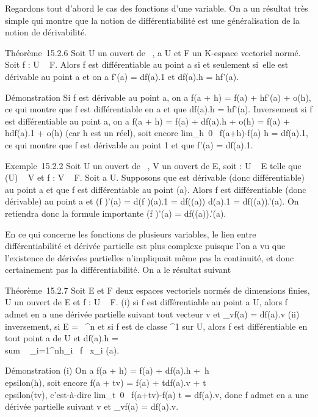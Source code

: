 Regardons tout d'abord le cas des fonctions d'une variable. On a un
résultat très simple qui montre que la notion de différentiabilité est
une généralisation de la notion de dérivabilité.

Théorème~15.2.6 Soit U un ouvert de ~, a \in U et F un K-espace vectoriel
normé. Soit f : U \rightarrow~ F. Alors f est différentiable au point a si et
seulement si~elle est dérivable au point a et on a f'(a) = df(a).1 et
df(a).h = hf'(a).

Démonstration Si f est dérivable au point a, on a f(a + h) = f(a) +
hf'(a) + o(h), ce qui montre que f est différentiable en a et que
df(a).h = hf'(a). Inversement si f est différentiable au point a, on a
f(a + h) = f(a) + df(a).h + o(h) = f(a) + hdf(a).1 + o(h) (car h est un
réel), soit encore lim_h\rightarrow~0~
f(a+h)-f(a) \over h = df(a).1, ce qui montre que f est
dérivable au point 1 et que f'(a) = df(a).1.

Exemple~15.2.2 Soit U un ouvert de ~, V un ouvert de E, soit \phi : U \rightarrow~ E
telle que \phi(U) \subset~ V et f : V \rightarrow~ F. Soit a \in U. Supposons que \phi est
dérivable (donc différentiable) au point a et que f est différentiable
au point \phi(a). Alors f \cdot \phi est différentiable (donc dérivable) au point
a et (f \cdot \phi)'(a) = d(f \cdot \phi)(a).1 = df(\phi(a)) \cdot d\phi(a).1 = df(\phi(a)).\phi'(a).
On retiendra donc la formule importante (f \cdot \phi)'(a) = df(\phi(a)).\phi'(a).

En ce qui concerne les fonctions de plusieurs variables, le lien entre
différentiabilité et dérivée partielle est plus complexe puisque l'on a
vu que l'existence de dérivées partielles n'impliquait même pas la
continuité, et donc certainement pas la différentiabilité. On a le
résultat suivant

Théorème~15.2.7 Soit E et F deux espaces vectoriels normés de dimensions
finies, U un ouvert de E et f : U \rightarrow~ F. (i) si f est différentiable au
point a \in U, alors f admet en a une dérivée partielle suivant tout
vecteur v et \partial_vf(a) = df(a).v (ii) inversement, si E =
~^n et si f est de classe ^1 sur U, alors f est
différentiable en tout point a de U et df(a).h
= \\sum ~
_i=1^nh_i \partial~f \over
\partial~x_i (a).

Démonstration (i) On a f(a + h) = f(a) + df(a).h
+\ h\\epsilon(h), soit encore
f(a + tv) = f(a) + tdf(a).v +
t\,\v\\epsilon(tv),
c'est-à-dire lim_t\rightarrow~0~ f(a+tv)-f(a)
\over t = df(a).v, donc f admet en a une dérivée
partielle suivant v et \partial_vf(a) = df(a).v.

